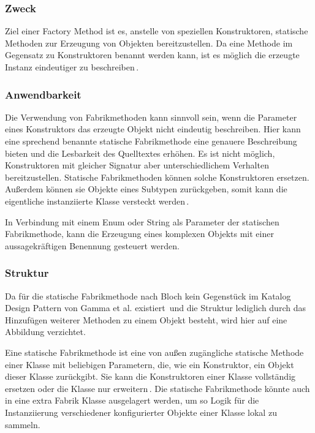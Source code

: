 \documentclass[12pt,oneside,a4paper,parskip]{scrbook}
\begin{document}
\subsubsection{Zweck}

Ziel einer Factory Method ist es, anstelle von speziellen Konstruktoren, statische Methoden zur Erzeugung von Objekten bereitzustellen. Da eine Methode im Gegensatz zu Konstruktoren benannt werden kann, ist es möglich die erzeugte Instanz eindeutiger zu beschreiben\,\cite[S.\,5f]{bloch2017}.

\subsubsection{Anwendbarkeit}

Die Verwendung von Fabrikmethoden kann sinnvoll sein, wenn die Parameter eines Konstruktors das erzeugte Objekt nicht eindeutig beschreiben. Hier kann eine sprechend benannte statische Fabrikmethode eine genauere Beschreibung bieten und die Lesbarkeit des Quelltextes erhöhen. Es ist nicht möglich, Konstruktoren mit gleicher Signatur aber unterschiedlichem Verhalten bereitzustellen. Statische Fabrikmethoden können solche Konstruktoren ersetzen. Außerdem können sie Objekte eines Subtypen zurückgeben, somit kann die eigentliche instanziierte Klasse versteckt werden\,\cite[S.\,5ff]{bloch2017}.

In Verbindung mit einem Enum oder String als Parameter der statischen Fabrikmethode, kann die Erzeugung eines komplexen Objekts mit einer aussagekräftigen Benennung gesteuert werden.

\subsubsection{Struktur}

Da für die statische Fabrikmethode nach Bloch kein Gegenstück im Katalog Design Pattern von Gamma et al. existiert\,\cite[S.\,5]{bloch2017} und die Struktur lediglich durch das Hinzufügen weiterer Methoden zu einem Objekt besteht, wird hier auf eine Abbildung verzichtet.

Eine statische Fabrikmethode ist eine von außen zugängliche statische Methode einer Klasse mit beliebigen Parametern, die, wie ein Konstruktor, ein Objekt dieser Klasse zurückgibt. Sie kann die Konstruktoren einer Klasse vollständig ersetzen oder die Klasse nur erweitern\,\cite[S.\,5f]{bloch2017}. Die statische Fabrikmethode könnte auch in eine extra Fabrik Klasse ausgelagert werden, um so Logik für die Instanziierung verschiedener konfigurierter Objekte einer Klasse lokal zu sammeln.
\end{document}
